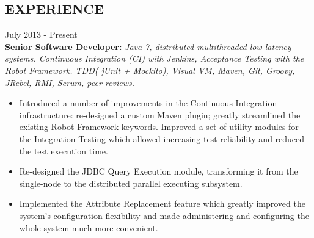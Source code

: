 \documentclass{res}
\begin{document}
\begin{resume}
\section{EXPERIENCE}
 \hfill        July 2013 - Present \\
{\bf Senior Software Developer:} {\em Java 7, distributed multithreaded low-latency systems. Continuous Integration (CI) with Jenkins, Acceptance Testing with the Robot Framework. TDD( jUnit + Mockito), Visual VM, Maven, Git, Groovy, JRebel, RMI, Scrum, peer reviews.}
\begin{itemize} \itemsep -2pt %
 \item Introduced a number of improvements in the Continuous Integration infrastructure: re-designed a custom Maven plugin; greatly streamlined the existing Robot Framework keywords. Improved a set of utility modules for the Integration Testing which allowed increasing test reliability and reduced the test execution time.
 \item Re-designed the JDBC Query Execution module, transforming it from the single-node to the distributed parallel executing subsystem.
 \item Implemented the Attribute Replacement feature which greatly improved the system’s configuration flexibility and made administering and configuring the whole system much more convenient.
 \end{itemize}


\end{resume}
\end{document}
